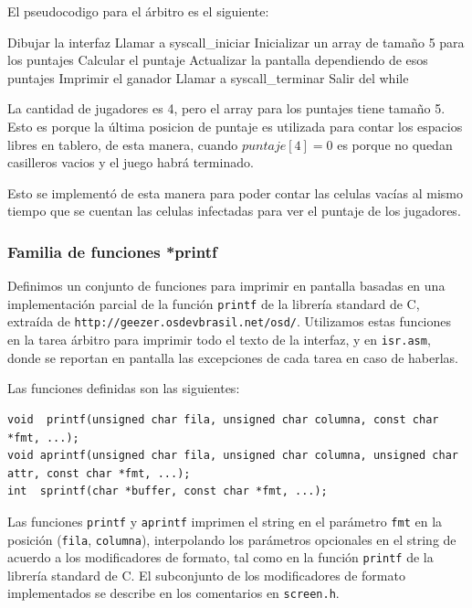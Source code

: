 \documentclass[a4paper,10pt,twoside]{article}
\newenvironment{pseudocodigo}
    {\vspace{0.5em} \begin{algorithmic}}
    {\end{algorithmic} \vspace{0.5em}}
\begin{document}
El pseudocodigo para el árbitro es el siguiente:

\begin{pseudocodigo}
  \STATE Dibujar la interfaz
  \STATE Llamar a syscall\_iniciar
  \STATE Inicializar un array de tamaño 5 para los puntajes
  \STATE
    \STATE Calcular el puntaje
    \STATE Actualizar la pantalla dependiendo de esos puntajes
    \STATE
      \STATE Imprimir el ganador
      \STATE Llamar a syscall\_terminar
      \STATE Salir del while
    \ENDIF
  \ENDWHILE
  \STATE
\end{pseudocodigo}

La cantidad de jugadores es 4, pero el array para los puntajes tiene tamaño 5. Esto es porque la última posicion de puntaje es utilizada para contar los espacios libres en tablero, de esta manera, cuando $puntaje[4]= 0$ es porque no quedan casilleros vacios y el juego habrá terminado.

Esto se implementó de esta manera para poder contar las celulas vacías al mismo tiempo que se cuentan las celulas infectadas para ver el puntaje de los jugadores.


\subsubsection{Familia de funciones *printf}

Definimos un conjunto de funciones para imprimir en pantalla basadas en una implementación parcial de la función \texttt{printf} de la librería standard de C, extraída de \texttt{http://geezer.osdevbrasil.net/osd/}. Utilizamos estas funciones en la tarea árbitro para imprimir todo el texto de la interfaz, y en \texttt{isr.asm}, donde se reportan en pantalla las excepciones de cada tarea en caso de haberlas.

Las funciones definidas son las siguientes:

\begin{verbatim}
void  printf(unsigned char fila, unsigned char columna, const char *fmt, ...);
void aprintf(unsigned char fila, unsigned char columna, unsigned char attr, const char *fmt, ...);
int  sprintf(char *buffer, const char *fmt, ...);
\end{verbatim}

Las funciones \texttt{printf} y \texttt{aprintf} imprimen el string en el parámetro \texttt{fmt} en la posición (\texttt{fila}, \texttt{columna}), interpolando los parámetros opcionales en el string de acuerdo a los modificadores de formato, tal como en la función \texttt{printf} de la librería standard de C. El subconjunto de los modificadores de formato implementados se describe en los comentarios en \texttt{screen.h}.
\end{document}
